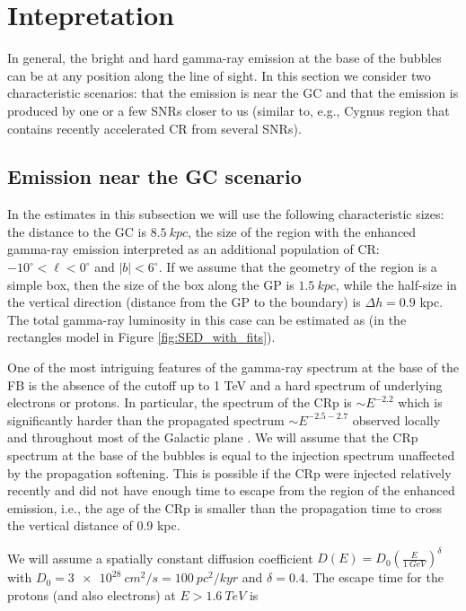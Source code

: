 \section{Intepretation}
\label{sec:Interpretation}

In general, the bright and hard gamma-ray emission at the base of the bubbles can be at any position along the line of sight.
In this section we consider two characteristic scenarios: that the emission is near the GC and that the emission is 
produced by one or a few SNRs closer to us (similar to, e.g., Cygnus region that contains recently accelerated CR from several SNRs).

\subsection{Emission near the GC scenario}

In the estimates in this subsection we will use the following characteristic sizes: 
the distance to the GC is $\SI{8.5}{kpc}$, 
the size of the region with the enhanced gamma-ray emission interpreted as an additional population of CR:
$-10^\circ < \ell < 0^\circ$ and $|b| < 6^\circ$.
If we assume that the geometry of the region is a simple box, then the size of the box along the GP is $\SI{1.5}{kpc}$,
while the half-size in the vertical direction (distance from the GP to the boundary) is $\Delta h = 0.9$ kpc.
The total gamma-ray luminosity in this case can be estimated as 
(in the rectangles model in Figure \ref{fig:SED_with_fits}).

One of the most intriguing features of the gamma-ray spectrum at the base of the FB is the absence of the cutoff up to 1 TeV and 
a hard spectrum of underlying electrons or protons.
In particular, the spectrum of the CRp is $\sim E^{-2.2}$ which is significantly harder than the propagated spectrum
$\sim E^{-2.5 - 2.7}$ observed locally and throughout most of the Galactic plane \citep{2016ApJS..223...26A}.
We will assume that the CRp spectrum at the base of the bubbles is equal to the injection spectrum unaffected by the 
propagation softening.
This is possible if the CRp were injected relatively recently and did not have enough time to escape from the region of the enhanced emission,
i.e., the age of the CRp is smaller than the propagation time to cross the vertical distance of 0.9 kpc.

We will assume a spatially constant diffusion coefficient $D(E) = D_0\left(\frac{E}{\SI{1}{GeV}}\right)^\delta$ with $D_0 = \SI{3e28}{cm^2/s} = \SI{100}{pc^2/kyr}$ and $\delta = 0.4$.
The escape time for the protons (and also electrons) at $E > \SI{1.6}{TeV}$ is 

